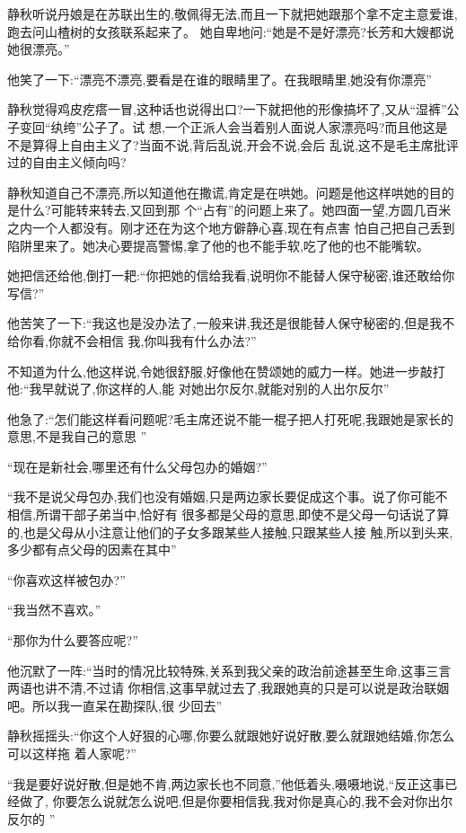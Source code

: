 ﻿\documentclass[12pt]{article}
\begin{document}
静秋听说丹娘是在苏联出生的,敬佩得无法,而且一下就把她跟那个拿不定主意爱谁,跑去问山楂树的女孩联系起来了。
她自卑地问:``她是不是\myrule 好漂亮?长芳和大嫂都说她很漂亮。''

他笑了一下:``漂亮不漂亮,要看是在谁的眼睛里了。在我眼睛里,她\myrule 没有你漂亮\myrule ''

静秋觉得鸡皮疙瘩一冒,这种话也说得出口?一下就把他的形像搞坏了,又从``湿裤''公子变回``纨绔''公子了。试
想,一个正派人会当着别人面说人家漂亮吗?而且他这是不是算得上自由主义了?当面不说,背后乱说,开会不说,会后
乱说,这不是毛主席批评过的自由主义倾向吗?

静秋知道自己不漂亮,所以知道他在撒谎,肯定是在哄她。问题是他这样哄她的目的是什么?可能转来转去,又回到那
个``占有''的问题上来了。她四面一望,方圆几百米之内一个人都没有。刚才还在为这个地方僻静心喜,现在有点害
怕自己把自己丢到陷阱里来了。她决心要提高警惕,拿了他的也不能手软,吃了他的也不能嘴软。

她把信还给他,倒打一耙:``你把她的信给我看,说明你不能替人保守秘密,谁还敢给你写信?''

他苦笑了一下:``我这也是没办法了,一般来讲,我还是很能替人保守秘密的,但是\myrule 我不给你看,你就不会相信
我,你叫我有什么办法?''

不知道为什么,他这样说,令她很舒服,好像他在赞颂她的威力一样。她进一步敲打他:``我早就说了,你这样的人,能
对她出尔反尔,就能对\myrule 别的人出尔反尔\myrule ''

他急了:``怎们能这样看问题呢?毛主席还说不能一棍子把人打死呢,我跟她是家长的意思,不是我自己的意思
\myrule ''

``现在是新社会,哪里还有什么父母包办的婚姻?''

``我不是说父母包办,我们也没有婚姻,只是两边家长要促成这个事。说了你可能不相信,所谓干部子弟当中,恰好有
很多都是父母的意思,即使不是父母一句话说了算的,也是父母从小注意让他们的子女多跟某些人接触,只跟某些人接
触,所以到头来,多少都有点\myrule 父母的因素在其中\myrule ''

``你喜欢这样被包办?''

``我当然不喜欢。''

``那你为什么要答应呢?''

他沉默了一阵:``当时的情况比较特殊,关系到我父亲的政治前途\myrule 甚至生命,这事三言两语也讲不清,不过请
你相信,这事早就过去了\myrule ,我跟她真的只是\myrule 可以说是\myrule 政治联姻吧。所以我一直呆在勘探队,很
少回去\myrule ''

静秋摇摇头:``你这个人\myrule 好狠的心哪,你要么就跟她好说好散,要么就跟她结婚,你怎么可以这样\myrule 拖
着人家呢?''

``我是要好说好散,但是\myrule 她不肯,两边家长也不\myrule 同意,''他低着头,嗫嗫地说,``反正这事已经做了,
你要怎么说就怎么说吧,但是你要相信我\myrule ,我\myrule 对你是真心的,我不会\myrule 对你出尔反尔的
\myrule ''
\end{document}
